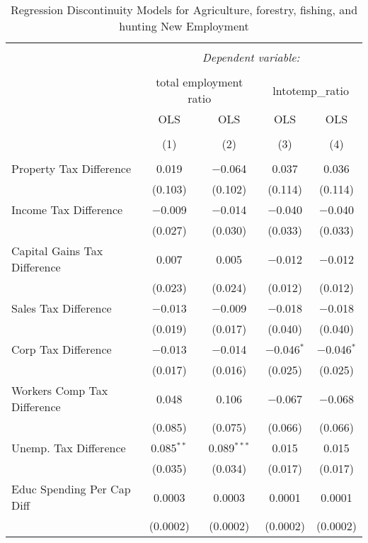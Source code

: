 
\begin{table}[!htbp] \centering 
  \caption{Regression Discontinuity Models for  Agriculture, forestry, fishing, and hunting New Employment} 
  \label{11rd} 
\begin{tabular}{@{\extracolsep{5pt}}lcccc} 
\\[-1.8ex]\hline 
\hline \\[-1.8ex] 
 & \multicolumn{4}{c}{\textit{Dependent variable:}} \\ 
\cline{2-5} 
\\[-1.8ex] & \multicolumn{2}{c}{total employment ratio} & \multicolumn{2}{c}{lntotemp\_ratio} \\ 
 & OLS & OLS & OLS & OLS \\ 
\\[-1.8ex] & (1) & (2) & (3) & (4)\\ 
\hline \\[-1.8ex] 
 Property Tax Difference & 0.019 & $-$0.064 & 0.037 & 0.036 \\ 
  & (0.103) & (0.102) & (0.114) & (0.114) \\ 
  Income Tax Difference & $-$0.009 & $-$0.014 & $-$0.040 & $-$0.040 \\ 
  & (0.027) & (0.030) & (0.033) & (0.033) \\ 
  Capital Gains Tax Difference & 0.007 & 0.005 & $-$0.012 & $-$0.012 \\ 
  & (0.023) & (0.024) & (0.012) & (0.012) \\ 
  Sales Tax Difference & $-$0.013 & $-$0.009 & $-$0.018 & $-$0.018 \\ 
  & (0.019) & (0.017) & (0.040) & (0.040) \\ 
  Corp Tax Difference & $-$0.013 & $-$0.014 & $-$0.046$^{*}$ & $-$0.046$^{*}$ \\ 
  & (0.017) & (0.016) & (0.025) & (0.025) \\ 
  Workers Comp Tax Difference & 0.048 & 0.106 & $-$0.067 & $-$0.068 \\ 
  & (0.085) & (0.075) & (0.066) & (0.066) \\ 
  Unemp. Tax Difference & 0.085$^{**}$ & 0.089$^{***}$ & 0.015 & 0.015 \\ 
  & (0.035) & (0.034) & (0.017) & (0.017) \\ 
  Educ Spending Per Cap Diff & 0.0003 & 0.0003 & 0.0001 & 0.0001 \\ 
  & (0.0002) & (0.0002) & (0.0002) & (0.0002) \\ 

\end{tabular}
\end{table}
